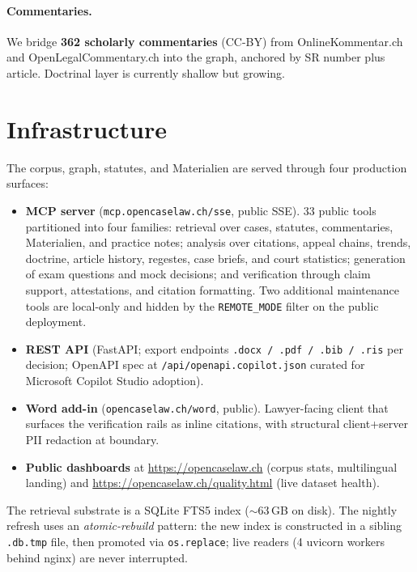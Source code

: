 \documentclass[11pt,a4paper]{article}
\begin{document}




\paragraph{Commentaries.} We bridge \textbf{362 scholarly commentaries} (CC-BY) from OnlineKommentar.ch and OpenLegalCommentary.ch into the graph, anchored by SR number plus article. Doctrinal layer is currently shallow but growing.

\section{Infrastructure}\label{sec:infra}

The corpus, graph, statutes, and Materialien are served through four production surfaces:
\begin{itemize}
\item \textbf{MCP server} (\texttt{mcp.opencaselaw.ch/sse}, public SSE). 33 public tools partitioned into four families: retrieval over cases, statutes, commentaries, Materialien, and practice notes; analysis over citations, appeal chains, trends, doctrine, article history, regestes, case briefs, and court statistics; generation of exam questions and mock decisions; and verification through claim support, attestations, and citation formatting. Two additional maintenance tools are local-only and hidden by the \texttt{REMOTE\_MODE} filter on the public deployment.
\item \textbf{REST API} (FastAPI; export endpoints \texttt{.docx / .pdf / .bib / .ris} per decision; OpenAPI spec at \texttt{/api/openapi.copilot.json} curated for Microsoft Copilot Studio adoption).
\item \textbf{Word add-in} (\texttt{opencaselaw.ch/word}, public). Lawyer-facing client that surfaces the verification rails as inline citations, with structural client+server PII redaction at boundary.
\item \textbf{Public dashboards} at \url{https://opencaselaw.ch} (corpus stats, multilingual landing) and \url{https://opencaselaw.ch/quality.html} (live dataset health).
\end{itemize}

The retrieval substrate is a SQLite FTS5 index ($\sim$63\,GB on disk). The nightly refresh uses an \emph{atomic-rebuild} pattern: the new index is constructed in a sibling \texttt{.db.tmp} file, then promoted via \texttt{os.replace}; live readers (4 uvicorn workers behind nginx) are never interrupted.
\end{document}

